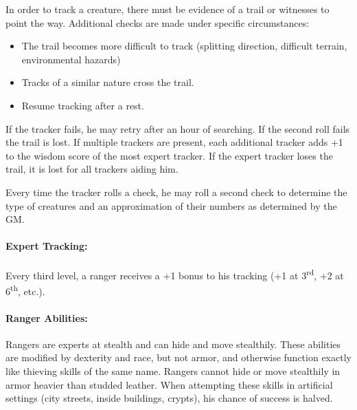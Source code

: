 \begin{multicols}{2}
\begin{minipage}{\columnwidth}
\end{minipage}

In order to track a creature, there must be evidence of a trail or witnesses to point the way.  Additional checks are made under specific circumstances:

\begin{itemize}

\item The trail becomes more difficult to track (splitting direction, difficult terrain, environmental hazards)

\item Tracks of a similar nature cross the trail.

\item Resume tracking after a rest.

\end{itemize}

If the tracker fails, he may retry after an hour of searching.  If the second roll fails the trail is lost.  If multiple trackers are present, each additional tracker adds +1 to the wisdom score of the most expert tracker.  If the expert tracker loses the trail, it is lost for all trackers aiding him. 

Every time the tracker rolls a check, he may roll a second check to determine the type of creatures and an approximation of their numbers as determined by the GM.

\paragraph{Expert Tracking:} Every third level, a ranger receives a +1 bonus to his tracking (+1 at 3\textsuperscript{rd}, +2 at 6\textsuperscript{th}, etc.).  

\paragraph{Ranger Abilities:} Rangers are experts at stealth and can hide and move stealthily.  These abilities are modified by dexterity and race, but not armor, and otherwise function exactly like thieving skills of the same name.  Rangers cannot hide or move stealthily in armor heavier than studded leather.  When attempting these skills in artificial settings (city streets, inside buildings, crypts), his chance of success is halved. 

\noindent
\begin{minipage}{\columnwidth}


\end{minipage}
\end{multicols}
